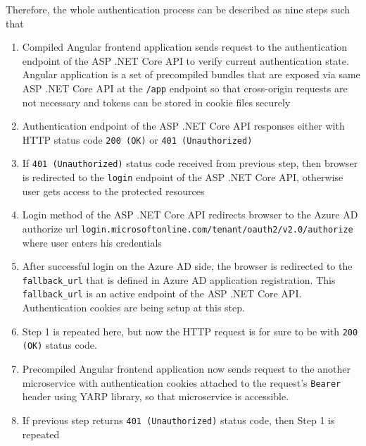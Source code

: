 Therefore, the whole authentication process can be described as nine steps such that
\begin{enumerate}
    \item Compiled Angular frontend application sends request to the authentication endpoint of the ASP .NET Core API
    to verify current authentication state.
    Angular application is a set of precompiled bundles that are exposed via same ASP .NET Core API at the \texttt{/app}
    endpoint so that cross-origin requests are not necessary and tokens can be stored in cookie files securely
    \item Authentication endpoint of the ASP .NET Core API responses either with
    HTTP status code \texttt{200 (OK)} or \texttt{401 (Unauthorized)}
    \item If \texttt{401 (Unauthorized)} status code received from previous step,
    then browser is redirected to the \texttt{login} endpoint of the ASP .NET Core API,
    otherwise user gets access to the protected resources
    \item Login method of the ASP .NET Core API redirects browser to the Azure AD authorize url
    \texttt{login.microsoftonline.com/tenant/oauth2/v2.0/authorize} where user enters his credentials
    \item After successful login on the Azure AD side, the browser is redirected to the \texttt{fallback\_url}
    that is defined in Azure AD application registration.
    This \texttt{fallback\_url} is an active endpoint of the ASP .NET Core API.
    Authentication cookies are being setup at this step.
    \item Step 1 is repeated here, but now the HTTP request is for sure to be with \texttt{200 (OK)} status code.
    \item Precompiled Angular frontend application now sends request to the another microservice with authentication cookies
    attached to the request's \texttt{Bearer} header using YARP library, so that microservice is accessible.
    \item If previous step returns \texttt{401 (Unauthorized)} status code, then Step 1 is repeated
\end{enumerate}